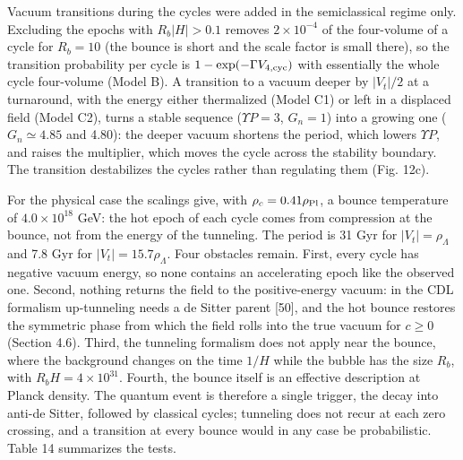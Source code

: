 \documentclass[11pt,a4paper]{article}
\begin{document}
Vacuum transitions during the cycles were added in the semiclassical regime only. Excluding the epochs with $R_b|H|>0.1$ removes $2\times10^{-4}$ of the four-volume of a cycle for $R_b=10$ (the bounce is short and the scale factor is small there), so the transition probability per cycle is $1-\exp(-\Gamma V_{4,\rm cyc})$ with essentially the whole cycle four-volume (Model B). A transition to a vacuum deeper by $|V_t|/2$ at a turnaround, with the energy either thermalized (Model C1) or left in a displaced field (Model C2), turns a stable sequence ($\Upsilon P=3$, $G_n=1$) into a growing one ($G_n\simeq4.85$ and 4.80): the deeper vacuum shortens the period, which lowers $\Upsilon P$, and raises the multiplier, which moves the cycle across the stability boundary. The transition destabilizes the cycles rather than regulating them (Fig. 12c).

For the physical case the scalings give, with $\rho_c=0.41\rho_{\rm Pl}$, a bounce temperature of $4.0\times10^{18}$ GeV: the hot epoch of each cycle comes from compression at the bounce, not from the energy of the tunneling. The period is 31 Gyr for $|V_t|=\rho_\Lambda$ and 7.8 Gyr for $|V_t|=15.7\rho_\Lambda$. Four obstacles remain. First, every cycle has negative vacuum energy, so none contains an accelerating epoch like the observed one. Second, nothing returns the field to the positive-energy vacuum: in the CDL formalism up-tunneling needs a de Sitter parent [50], and the hot bounce restores the symmetric phase from which the field rolls into the true vacuum for $c\ge0$ (Section 4.6). Third, the tunneling formalism does not apply near the bounce, where the background changes on the time $1/H$ while the bubble has the size $R_b$, with $R_bH=4\times10^{31}$. Fourth, the bounce itself is an effective description at Planck density. The quantum event is therefore a single trigger, the decay into anti-de Sitter, followed by classical cycles; tunneling does not recur at each zero crossing, and a transition at every bounce would in any case be probabilistic. Table 14 summarizes the tests.
\end{document}

